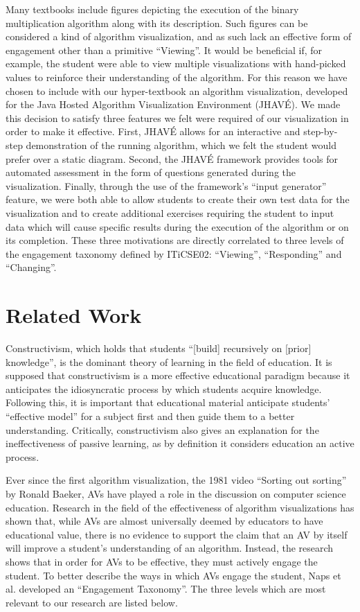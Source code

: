 \documentclass{acm_proc_article-sp}
\begin{document}
Many textbooks include figures depicting the execution of the binary multiplication algorithm along with its description\cite{needsCitation}.
Such figures can be considered a kind of algorithm visualization, and as such lack an effective form of engagement other than a primitive ``Viewing''.
It would be beneficial if, for example, the student were able to view multiple visualizations with hand-picked values to reinforce their understanding of the algorithm.
For this reason we have chosen to include with our hyper-textbook an algorithm visualization, developed for the Java Hosted Algorithm Visualization Environment (JHAVÉ)\cite{JHAVE}.
We made this decision to satisfy three features we felt were required of our visualization in order to make it effective.
First, JHAVÉ allows for an interactive and step-by-step demonstration of the running algorithm, which we felt the student would prefer over a static diagram.
Second, the JHAVÉ framework provides tools for automated assessment in the form of questions generated during the visualization.
Finally, through the use of the framework's ``input generator'' feature, we were both able to allow students to create their own test data for the visualization and to create additional exercises requiring the student to input data which will cause specific results during the execution of the algorithm or on its completion.
These three motivations are directly correlated to three levels of the engagement taxonomy defined by ITiCSE02: ``Viewing'', ``Responding'' and ``Changing''.

\section{Related Work}
Constructivism, which holds that students ``[build] recursively on [prior] knowledge'', is the dominant theory of learning in the field of education.
It is supposed that constructivism is a more effective educational paradigm because it anticipates the idiosyncratic process by which students acquire knowledge\cite{constr}.
Following this, it is important that educational material anticipate students' ``effective model'' for a subject first and then guide them to a better understanding.
Critically, constructivism also gives an explanation for the ineffectiveness of passive learning, as by definition it considers education an active process\cite{constr}.

Ever since the first algorithm visualization, the 1981 video ``Sorting out sorting'' by Ronald Baeker\cite{sorting}, AVs have played a role in the discussion on computer science education.
Research in the field of the effectiveness of algorithm visualizations has shown that, while AVs are almost universally deemed by educators to have educational value\cite{tnaps:visengage}, there is no evidence to support the claim that an AV by itself will improve a student's understanding of an algorithm.
Instead, the research shows that in order for AVs to be effective, they must actively engage the student\cite{tnaps:visengage}.
To better describe the ways in which AVs engage the student, Naps et al.
developed an ``Engagement Taxonomy''.
The three levels which are most relevant to our research are listed below.\cite{tnaps:visengage}
\end{document}
